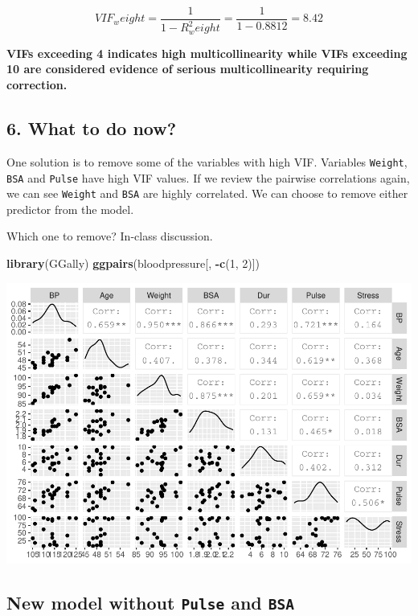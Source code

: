 \documentclass[]{article}
\newenvironment{Shaded}{\begin{snugshade}}{\end{snugshade}}
\newcommand{\DecValTok}[1]{\textcolor[rgb]{0.00,0.00,0.81}{#1}}
\newcommand{\KeywordTok}[1]{\textcolor[rgb]{0.13,0.29,0.53}{\textbf{#1}}}
\newcommand{\NormalTok}[1]{#1}
\newcommand{\OperatorTok}[1]{\textcolor[rgb]{0.81,0.36,0.00}{\textbf{#1}}}
\begin{document}
\[VIF_weight = \frac{1}{1-R^2_weight} = \frac{1}{1-0.8812} = 8.42\]

\textbf{VIFs exceeding 4 indicates high multicollinearity while VIFs
exceeding 10 are considered evidence of serious multicollinearity
requiring correction.}

\hypertarget{what-to-do-now}{%
\subsection{6. What to do now?}\label{what-to-do-now}}

One solution is to remove some of the variables with high VIF. Variables
\texttt{Weight}, \texttt{BSA} and \texttt{Pulse} have high VIF values.
If we review the pairwise correlations again, we can see \texttt{Weight}
and \texttt{BSA} are highly correlated. We can choose to remove either
predictor from the model.

Which one to remove? In-class discussion.

\begin{Shaded}
\begin{Highlighting}[]
\KeywordTok{library}\NormalTok{(GGally)}
\KeywordTok{ggpairs}\NormalTok{(bloodpressure[, }\OperatorTok{-}\KeywordTok{c}\NormalTok{(}\DecValTok{1}\NormalTok{, }\DecValTok{2}\NormalTok{)])}
\end{Highlighting}
\end{Shaded}

\includegraphics{regression13_files/figure-latex/unnamed-chunk-6-1.pdf}

\newpage

\hypertarget{new-model-without-pulse-and-bsa}{%
\subsection{\texorpdfstring{New model without \texttt{Pulse} and
\texttt{BSA}}{New model without Pulse and BSA}}\label{new-model-without-pulse-and-bsa}}
\end{document}
